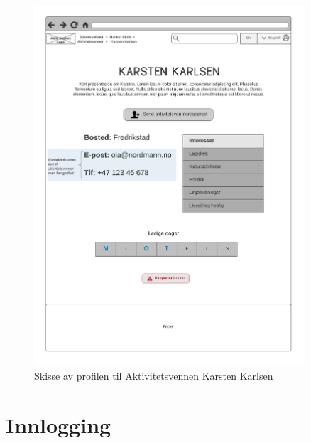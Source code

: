 \begin{figure}[H]
\centering
\includegraphics[width=0.9\textwidth]{Illustrasjoner/Skisser/2.0/2-6-aktivitetsvenn-profil.png}
\caption{Skisse av profilen til Aktivitetsvennen Karsten Karlsen}
\label{vedlegg:2-6-aktivitetsvenn-profil}
\end{figure}

\section{Innlogging}

